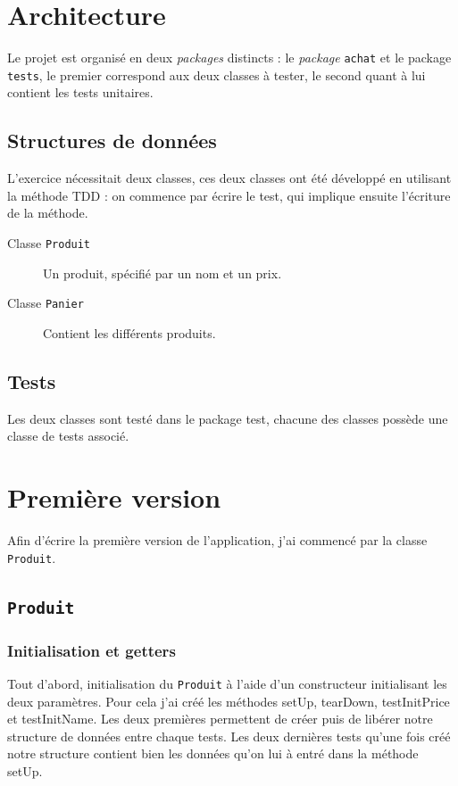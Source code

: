 \documentclass[a4paper, 11pt]{article}
\begin{document}
	\maketitle
	\section{Architecture}
	Le projet est organisé en deux \textit{packages} distincts : le \textit{package} \texttt{achat} et le package \texttt{tests}, le premier correspond aux deux
	classes à tester, le second quant à lui contient les tests unitaires.

	\subsection{Structures de données}
	L'exercice nécessitait deux classes, ces deux classes ont été développé en utilisant la méthode TDD : on commence par écrire le test, qui implique ensuite
	l'écriture de la méthode.

	\begin{description}
		\item[Classe \texttt{Produit}] Un produit, spécifié par un nom et un prix.
		\item[Classe \texttt{Panier}] Contient les différents produits.
	\end{description}

	\subsection{Tests}
	Les deux classes sont testé dans le package test, chacune des classes possède une classe de tests associé.

	\section{Première version}
	Afin d'écrire la première version de l'application, j'ai commencé par la classe \texttt{Produit}.

	\subsection{\texttt{Produit}}
	\subsubsection{Initialisation et getters}
	Tout d'abord, initialisation du \texttt{Produit} à l'aide d'un constructeur initialisant les deux paramètres. Pour cela j'ai créé les méthodes setUp,
	tearDown, testInitPrice et testInitName. Les deux premières permettent de créer puis de libérer notre structure de données entre chaque tests. Les deux
	dernières tests qu'une fois créé notre structure contient bien les données qu'on lui à entré dans la méthode setUp.
\end{document}
